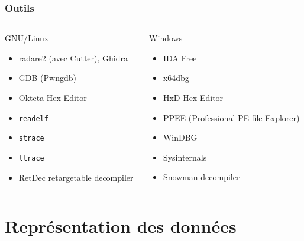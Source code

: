 \documentclass[10pt,xcolor={table,dvipsnames},t]{beamer}
\begin{document}
\begin{frame}
    \frametitle{Outils}
    
    \begin{columns}[T]
    
        \begin{column}{0.48\textwidth}
        GNU/Linux
        \begin{itemize}
            \item radare2 (avec Cutter), Ghidra
            \item GDB (Pwngdb)
            \item Okteta Hex Editor
            \item \texttt{readelf}
            \item \texttt{strace}
            \item \texttt{ltrace}
            \item RetDec retargetable decompiler 
        \end{itemize}
        \end{column}
        
        \begin{column}{0.48\textwidth}
        Windows
        \begin{itemize}
            \item IDA Free
            \item x64dbg
            \item HxD Hex Editor
            \item PPEE (Professional PE file Explorer)
            \item WinDBG
            \item Sysinternals
            \item Snowman decompiler
        \end{itemize}
        \end{column}
    
    \end{columns}
\end{frame}


\section{Représentation des données}
\end{document}
